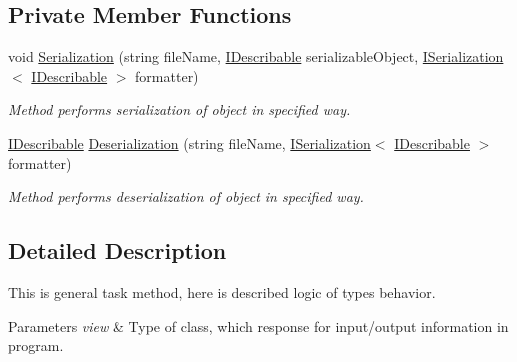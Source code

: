 \subsection*{Private Member Functions}
\begin{DoxyCompactItemize}
\item 
void \mbox{\hyperlink{class_home_work_1_1_task_library_1_1_tasks_1_1_lesson10_1_1_task1_aa214b4e6e7786da8866595b753581ad5}{Serialization}} (string file\+Name, \mbox{\hyperlink{interface_home_work_1_1_task_library_1_1_tasks_1_1_lesson10_1_1_interfaces_1_1_i_describable}{I\+Describable}} serializable\+Object, \mbox{\hyperlink{interface_home_work_1_1_task_library_1_1_tasks_1_1_lesson10_1_1_interfaces_1_1_i_serialization}{I\+Serialization}}$<$ \mbox{\hyperlink{interface_home_work_1_1_task_library_1_1_tasks_1_1_lesson10_1_1_interfaces_1_1_i_describable}{I\+Describable}} $>$ formatter)
\begin{DoxyCompactList}\small\item\em Method performs serialization of object in specified way. \end{DoxyCompactList}\item 
\mbox{\hyperlink{interface_home_work_1_1_task_library_1_1_tasks_1_1_lesson10_1_1_interfaces_1_1_i_describable}{I\+Describable}} \mbox{\hyperlink{class_home_work_1_1_task_library_1_1_tasks_1_1_lesson10_1_1_task1_af627fdb267ed4ffa10577e8f97599ace}{Deserialization}} (string file\+Name, \mbox{\hyperlink{interface_home_work_1_1_task_library_1_1_tasks_1_1_lesson10_1_1_interfaces_1_1_i_serialization}{I\+Serialization}}$<$ \mbox{\hyperlink{interface_home_work_1_1_task_library_1_1_tasks_1_1_lesson10_1_1_interfaces_1_1_i_describable}{I\+Describable}} $>$ formatter)
\begin{DoxyCompactList}\small\item\em Method performs deserialization of object in specified way. \end{DoxyCompactList}\end{DoxyCompactItemize}


\subsection{Detailed Description}
This is general task method, here is described logic of types behavior. 


\begin{DoxyParams}{Parameters}
{\em view} & Type of class, which response for input/output information in program.\\
\hline
\end{DoxyParams}


